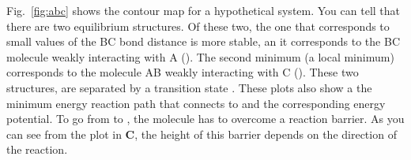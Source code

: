 \documentclass[../Main/chem371-notes.tex]{subfiles}
\begin{document}
Fig.~\ref{fig:abc} shows the contour map for a hypothetical  system.
You can tell that there are two equilibrium structures. Of these two, the one that corresponds to small values of the BC bond distance is more stable, an it corresponds to the BC molecule weakly interacting with A ().
The second minimum (a local minimum) corresponds to the molecule AB weakly interacting with C ().
These two structures, are separated by a transition state .
These plots also show a the minimum energy reaction path that connects  to  and the corresponding energy potential.
To go from  to , the molecule has to overcome a reaction barrier.
As you can see from the plot in \textbf{C}, the height of this barrier depends on the direction of the reaction.  

\end{document}
